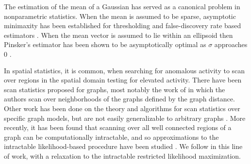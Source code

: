 The estimation of the mean of a Gaussian has served as a canonical problem in nonparametric statistics.
When the mean is assumed to be sparse, asymptotic minimaxity has been established for thresholding and false-discovery rate based estimators \cite{donoho1995wavelet,abramovich2006adapting}.
When the mean vector is assumed to lie within an ellipsoid then Pinsker's estimator has been shown to be asymptotically optimal as $\sigma$ approaches $0$ \cite{johnstone2002function}.

In spatial statistics, it is common, when searching for anomalous activity to scan over regions in the spatial domain testing for elevated activity\cite{neill2004rapid,agarwal2006spatial}.
There have been scan statistics proposed for graphs, most notably the work of \cite{priebe2005scan} in which the authors scan over neighborhoods of the graphs defined by the graph distance.
Other work has been done on the theory and algorithms for scan statistics over specific graph models, but are not easily generalizable to arbitrary graphs \cite{yi2009unified, arias2011detection}.
More recently, it has been found that scanning over all well connected regions of a graph can be computationally intractable, and so approximations to the intractable likelihood-based procedure have been studied \cite{sharpnack2012changepoint,sharpnack2012detecting}.
We follow in this line of work, with a relaxation to the intractable restricted likelihood maximization.
